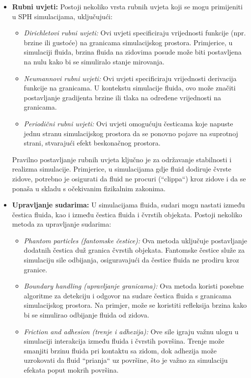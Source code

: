 \documentclass[diplomskirad]{fer}
\begin{document}
    \begin{itemize}
        \item \textbf{Rubni uvjeti:} Postoji nekoliko vrsta rubnih uvjeta koji se mogu primijeniti u SPH simulacijama, uključujući:
        \begin{itemize}
            \item \textit{Dirichletovi rubni uvjeti:} Ovi uvjeti specificiraju vrijednosti funkcije (npr. brzine ili gustoće) na granicama simulacijskog prostora. Primjerice, u simulaciji fluida, brzina fluida na zidovima posude može biti postavljena na nulu kako bi se simuliralo stanje mirovanja.
            \item \textit{Neumannovi rubni uvjeti:} Ovi uvjeti specificiraju vrijednosti derivacija funkcije na granicama. U kontekstu simulacije fluida, ovo može značiti postavljanje gradijenta brzine ili tlaka na određene vrijednosti na granicama.
            \item \textit{Periodični rubni uvjeti:} Ovi uvjeti omogućuju česticama koje napuste jednu stranu simulacijskog prostora da se ponovno pojave na suprotnoj strani, stvarajući efekt beskonačnog prostora.
        \end{itemize}
        Pravilno postavljanje rubnih uvjeta ključno je za održavanje stabilnosti i realizma simulacije.
        Primjerice, u simulacijama gdje fluid dodiruje čvrste zidove, potrebno je osigurati da fluid ne procuri (``clippa``) kroz zidove i da se ponaša u skladu s očekivanim fizikalnim zakonima.

        \item \textbf{Upravljanje sudarima:} U simulacijama fluida, sudari mogu nastati između čestica fluida, kao i između čestica fluida i čvrstih objekata. Postoji nekoliko metoda za upravljanje sudarima:
        \begin{itemize}
            \item \textit{Phantom particles (fantomske čestice):} Ova metoda uključuje postavljanje dodatnih čestica duž granica čvrstih objekata. Fantomske čestice služe za simulaciju sile odbijanja, osiguravajući da čestice fluida ne prodiru kroz granice.
            \item \textit{Boundary handling (upravljanje granicama):} Ova metoda koristi posebne algoritme za detekciju i odgovor na sudare čestica fluida s granicama simulacijskog prostora. Na primjer, može se koristiti refleksija brzina kako bi se simulirao odbijanje fluida od zidova.
            \item \textit{Friction and adhesion (trenje i adhezija):} Ove sile igraju važnu ulogu u simulaciji interakcija između fluida i čvrstih površina. Trenje može smanjiti brzinu fluida pri kontaktu sa zidom, dok adhezija može uzrokovati da fluid ``prianja`` uz površine, što je važno za simulaciju efekata poput mokrih površina.
        \end{itemize}


\end{itemize}
\end{document}
